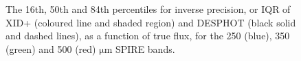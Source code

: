 \documentclass[useAMS,usenatbib]{mnras}
\begin{document}
\begin{figure}
\centering 
\caption{The 16th, 50th and 84th percentiles for inverse precision, or IQR of \textsc{XID+} (coloured line and shaded region) and \textsc{DESPHOT}  (black solid and dashed lines), as a function of true flux, for the 250 (blue), 350 (green) and 500 (red) $\mathrm{\mu m}$ SPIRE bands. }\label{fig:precision}
\end{figure}
\end{document}
